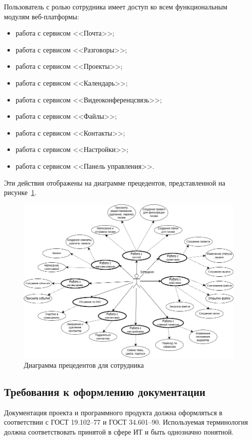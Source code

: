 Пользователь с ролью сотрудника имеет доступ ко всем функциональным модулям веб-платформы:
\begin{itemize}
  \item работа с сервисом <<Почта>>;
  \item работа с сервисом <<Разговоры>>;
  \item работа с сервисом <<Проекты>>;
  \item работа с сервисом <<Календарь>>;
  \item работа с сервисом <<Видеоконференцсвязь>>;
  \item работа с сервисом <<Файлы>>;
  \item работа с сервисом <<Контакты>>;
  \item работа с сервисом <<Настройки>>;
  \item работа с сервисом <<Панель управления>>.
\end{itemize}
Эти действия отображены на диаграмме прецедентов, представленной на рисунке~\ref{templ:actor1}.
\begin{figure}[H]
	\centering
	\includegraphics[width=1\linewidth]{images/umldi}
	\caption{Диаграмма прецедентов для сотрудника}
	\label{templ:actor1}
\end{figure}

\subsection{Требования к оформлению документации}

Документация проекта и программного продукта должна оформляться в соответствии с ГОСТ 19.102–77 и ГОСТ 34.601–90. Используемая терминология должна соответствовать принятой в сфере ИТ и быть однозначно понятной.
